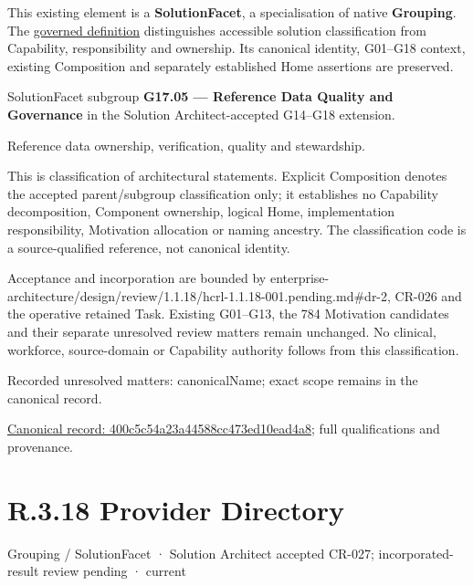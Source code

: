 This existing element is a \textbf{SolutionFacet}, a specialisation of native
\textbf{Grouping}. The \href{\detokenize{../../../../../../../governance/continuum-representation.md#solutionfacet-classification--1119-candidate}}{governed definition}
distinguishes accessible solution classification from Capability, responsibility
and ownership. Its canonical identity, G01–G18 context, existing Composition
and separately established Home assertions are preserved.



SolutionFacet subgroup \textbf{G17.05 — Reference Data Quality and Governance} in the Solution Architect-accepted G14–G18 extension.



Reference data ownership, verification, quality and stewardship.



This is classification of architectural statements. Explicit Composition denotes the accepted parent/subgroup classification only; it establishes no Capability decomposition, Component ownership, logical Home, implementation responsibility, Motivation allocation or naming ancestry. The classification code is a source-qualified reference, not canonical identity.



Acceptance and incorporation are bounded by enterprise-architecture/design/review/1.1.18/hcrl-1.1.18-001.pending.md\#dr-2, CR-026 and the operative retained Task. Existing G01–G13, the 784 Motivation candidates and their separate unresolved review matters remain unchanged. No clinical, workforce, source-domain or Capability authority follows from this classification.


{\small Recorded unresolved matters: canonicalName; exact scope remains in the canonical record.}\par
{\footnotesize \href{../../../../../../../continuum/grouping/400c5c54a23a44588cc473ed10ead4a8.md}{Canonical record: 400c5c54a23a44588cc473ed10ead4a8}; full qualifications and provenance.}\par
\section*{R.3.18 Provider Directory}
\label{navigation:R.3.18}

\label{element:0233415953ed487fbbe407ebb469e7bc}
{\small Grouping / SolutionFacet · Solution Architect accepted CR-027; incorporated-result review pending · current}\par

